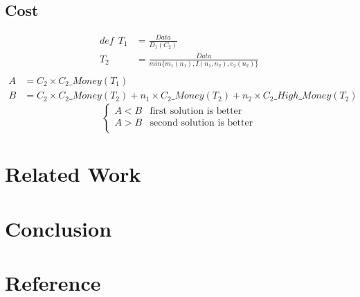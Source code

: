 \documentclass{article}
\begin{document}
\subsection{Cost}
\begin{align*}
def\ \ T_1&=\frac{Data}{D_1(C_2)}\\ T_2&=\frac{Data}{min\{m_1(n_1),I(n_1,n_2),e_2(n_2)\}}\\
\end{align*}
\begin{align*}
A&=C_2\times C_2\_Money(T_1)\\
B&=C_2\times C_2\_Money(T_2)+n_1\times C_2\_Money(T_2)+n_2\times C_2\_High\_Money(T_2)
\end{align*}
\begin{equation*}
\begin{cases}
A<B & \text{first solution is better}\\
A>B & \text{second solution is better}\\
\end{cases}
\end{equation*}
\section{Related Work}
\section{Conclusion}
\section*{Reference}
\end{document}
